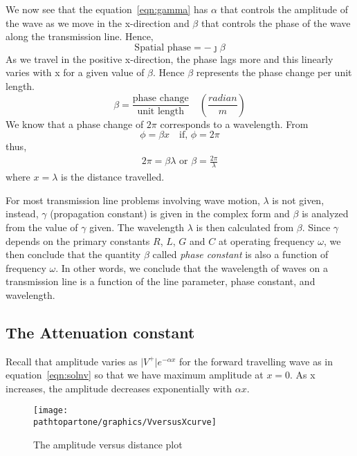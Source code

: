 We now see that the equation~\eqref{eqn:gamma} has $\alpha$ that controls the amplitude of the wave as we move in the x-direction and $\beta$ that controls the phase of the wave along the transmission line. Hence,
\begin{equation}
\text{Spatial phase} = -\jmath\beta
\end{equation}
As we travel in the positive x-direction, the phase lags more and this linearly varies with x for a given value of $\beta$. Hence $\beta$ represents the phase change per unit length.
\begin{equation}
\beta = \frac{\text{phase change}}{\text{unit length}} \quad\left(\frac{radian}{m}\right)
\label{eqn:phaseconstant}
\end{equation}
We know that a phase change of $2\pi$ corresponds to a wavelength. From
\begin{equation*}
\phi = \beta x \quad\text{if, }\phi = 2\pi
\end{equation*}
thus,
\begin{align*}
2\pi = \beta\lambda\text{ or }\beta = \frac{2\pi}{\lambda}
\end{align*}
where $ x = \lambda $ is the distance travelled.

For most transmission line problems involving wave motion, $\lambda$ is not given, instead, $\gamma$ (propagation constant) is given in the complex form and $\beta$ is analyzed from the value of $\gamma$ given. The wavelength $\lambda$ is then calculated from $\beta$. Since $\gamma$ depends on the primary constants $R$, $L$, $G$ and $C$ at operating frequency $\omega$, we then conclude that the quantity $\beta$ called \emph{phase constant} is also a function of frequency $\omega$. In other words, we conclude that the wavelength of waves on a transmission line is a function of the line parameter, phase constant, and wavelength.

\subsection{The Attenuation constant}
Recall that amplitude varies as $\lvert V^+\rvert e^{-\alpha x}$ for the forward travelling wave as in equation~\eqref{eqn:solnv} so that we have maximum amplitude at $x = 0$. As x increases, the amplitude decreases exponentially with $\alpha x$. 
\begin{figure}[h]
\centering
\texttt{[image: \\pathtopartone/graphics/VversusXcurve]}
\caption{The amplitude versus distance plot}
\label{fig:VversusXcurve}
\end{figure}

